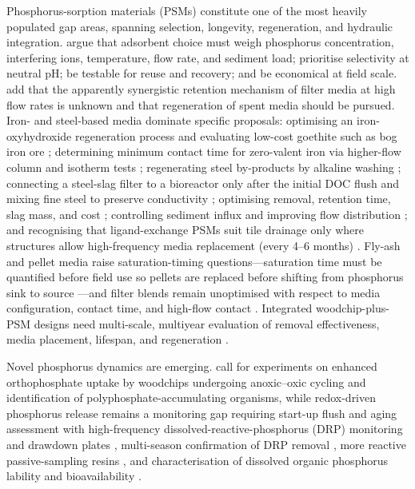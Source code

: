 \documentclass[11pt]{article}
\begin{document}
Phosphorus-sorption materials (PSMs) constitute one of the most heavily populated
gap areas, spanning selection, longevity, regeneration, and hydraulic
integration. \textcite{Li2020} argue that adsorbent choice must weigh phosphorus
concentration, interfering ions, temperature, flow rate, and sediment load;
prioritise selectivity at neutral pH; be testable for reuse and recovery; and be
economical at field scale. \textcite{Mendes2022} add that the apparently
synergistic retention mechanism of filter media at high flow rates is unknown and
that regeneration of spent media should be pursued. Iron- and steel-based media
dominate specific proposals: optimising an iron-oxyhydroxide regeneration process
and evaluating low-cost goethite such as bog iron ore \parencite{Allred2017};
determining minimum contact time for zero-valent iron via higher-flow column and
isotherm tests \parencite{Allred2014}; regenerating steel by-products by alkaline
washing \parencite{Hua2016}; connecting a steel-slag filter to a bioreactor only
after the initial DOC flush and mixing fine steel to preserve conductivity
\parencite{Sellner2019b}; optimising removal, retention time, slag mass, and cost
\parencite{Wang2020d}; controlling sediment influx and improving flow
distribution \parencite{Shedekar2020}; and recognising that ligand-exchange PSMs
suit tile drainage only where structures allow high-frequency media replacement
(every 4--6 months) \parencite{Penn2020}. Fly-ash and pellet media raise
saturation-timing questions---saturation time must be quantified before field use
so pellets are replaced before shifting from phosphorus sink to source
\parencite{Li2017,Li2018b}---and filter blends remain unoptimised with respect to
media configuration, contact time, and high-flow contact
\parencite{Agrawal2011,Agrawal2011b,Kumari2025,Kankarej2023}. Integrated
woodchip-plus-PSM designs need multi-scale, multiyear evaluation of removal
effectiveness, media placement, lifespan, and regeneration \parencite{Husk2018}.

Novel phosphorus dynamics are emerging. \textcite{Zhang2024b} call for
experiments on enhanced orthophosphate uptake by woodchips undergoing
anoxic--oxic cycling and identification of polyphosphate-accumulating organisms,
while redox-driven phosphorus release remains a monitoring gap requiring start-up
flush and aging assessment with high-frequency dissolved-reactive-phosphorus
(DRP) monitoring and drawdown plates \parencite{Bailon2025}, multi-season
confirmation of DRP removal \parencite{Rivas2020}, more reactive passive-sampling
resins \parencite{Li2020b}, and characterisation of dissolved organic phosphorus
lability and bioavailability \parencite{Liu2024b}.
\end{document}
